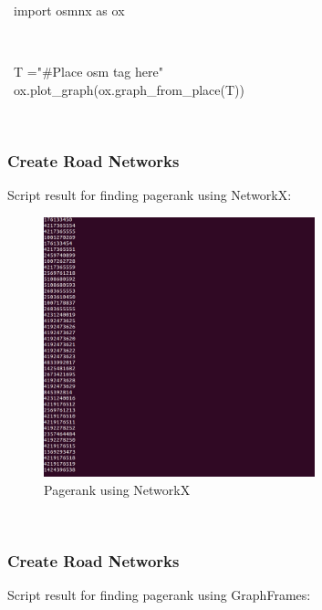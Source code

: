 \begin{description}
	
	\item [\ import osmnx as ox]\\
	\item [\ T ="#Place osm tag here"]
	\item [\ ox.plot\_graph(ox.graph\_from\_place(T))]\\
	
\end{description}

\subsubsection{Create Road Networks}
Script result for finding pagerank using NetworkX:

\begin{figure}[!ht]
	\centering
	\includegraphics[width=0.7\textwidth]{input/images/pg.jpg}              
	\caption{Pagerank using NetworkX}
	\hspace{-1.5em}
\end{figure}\\

\subsubsection{Create Road Networks}
Script result for finding pagerank using GraphFrames:

